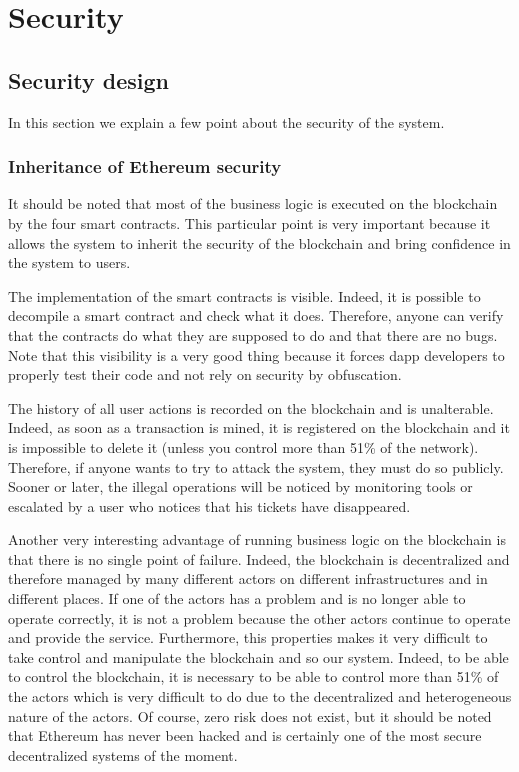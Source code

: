 \documentclass[a4paper,11pt,oneside]{report}
\begin{document}
\chapter{Security}

\section{Security design}
In this section we explain a few point about the security of the system.

\subsection{Inheritance of Ethereum security}
It should be noted that most of the business logic is executed on the blockchain by the four smart contracts. This particular point is very important because it allows the system to inherit the security of the blockchain and bring confidence in the system to users.

The implementation of the smart contracts is visible. Indeed, it is possible to decompile a smart contract and check what it does. Therefore, anyone can verify that the contracts do what they are supposed to do and that there are no bugs. Note that this visibility is a very good thing because it forces dapp developers to properly test their code and not rely on security by obfuscation.

The history of all user actions is recorded on the blockchain and is unalterable. Indeed, as soon as a transaction is mined, it is registered on the blockchain and it is impossible to delete it (unless you control more than 51\% of the network). Therefore, if anyone wants to try to attack the system, they must do so publicly. Sooner or later, the illegal operations will be noticed by monitoring tools or escalated by a user who notices that his tickets have disappeared. 

Another very interesting advantage of running business logic on the blockchain is that there is no single point of failure. Indeed, the blockchain is decentralized and therefore managed by many different actors on different infrastructures and in different places. If one of the actors has a problem and is no longer able to operate correctly, it is not a problem because the other actors continue to operate and provide the service. Furthermore, this properties makes it very difficult to take control and manipulate the blockchain and so our system. Indeed, to be able to control the blockchain, it is necessary to be able to control more than 51\% of the actors which is very difficult to do due to the decentralized and heterogeneous nature of the actors. Of course, zero risk does not exist, but it should be noted that Ethereum has never been hacked and is certainly one of the most secure decentralized systems of the moment.
\end{document}
